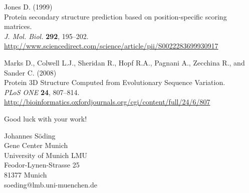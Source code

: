 \documentclass[11pt,a4paper]{article}
\begin{document}
\begin{thebibliography}{31}
Jones D. (1999)\\
{Protein secondary structure prediction based on position-specific scoring matrices.}\\
\newblock \emph{J. Mol. Biol.} \textbf{292}, 195--202.\\
\newblock \url{http://www.sciencedirect.com/science/article/pii/S0022283699930917}

Marks D., Colwell L.J., Sheridan R., Hopf R.A., Pagnani A., Zecchina R., and Sander C. (2008)\\
{Protein 3D Structure Computed from Evolutionary Sequence Variation.}\\
\newblock \emph{PLoS ONE} \textbf{24}, 807--814.\\
\newblock \url{http://bioinformatics.oxfordjournals.org/cgi/content/full/24/6/807}


\end{thebibliography}


\vspace{20mm}
\begin{center}
Good luck with your work!

\vspace{5mm}
Johannes S\"oding\\[2mm]
Gene Center Munich\\
University of Munich {LMU}\\
Feodor-Lynen-Strasse 25\\
81377 Munich\\
soeding@lmb.uni-muenchen.de\\
\end{center}
\end{document}
